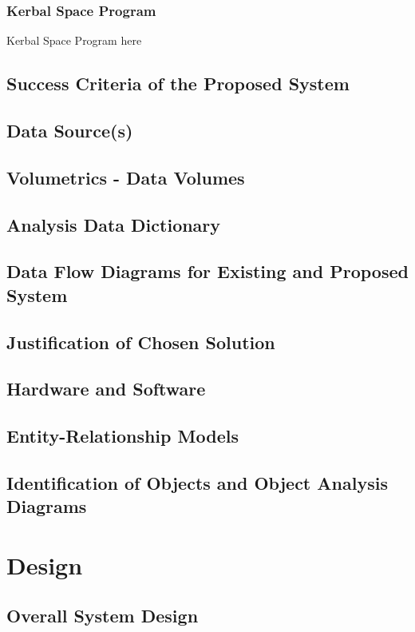 \documentclass[11pt]{article}
\begin{document}
            \subsubsection{Kerbal Space Program}
                Kerbal Space Program here

        \subsection{Success Criteria of the Proposed System}
        \subsection{Data Source(s)}
        \subsection{Volumetrics - Data Volumes}
        \subsection{Analysis Data Dictionary}
        \subsection{Data Flow Diagrams for Existing and Proposed System}
        \subsection{Justification of Chosen Solution}
        \subsection{Hardware and Software}
        \subsection{Entity-Relationship Models}
        \subsection{Identification of Objects and Object Analysis Diagrams}

    \section{Design}
        \subsection{Overall System Design}
\end{document}
